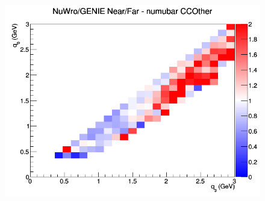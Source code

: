 \begin{figure}[h]
\endminipage
{}
\includegraphics[width=\linewidth]{q0_q3/nominal/ratios/CCOther_NuWro_GENIE_numubar_NF_q3_q0.png}
\endminipage
\newline
\end{figure}
\clearpage
